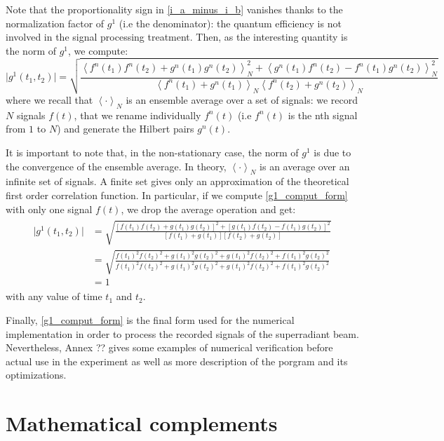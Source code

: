 \documentclass[12pt]{report}
\begin{document}
Note that the proportionality sign in \eqref{i_a_minus_i_b} vanishes thanks to the normalization factor of $g^1$ (i.e the denominator): the quantum efficiency is not involved in the signal processing treatment. Then, as the interesting quantity is the norm of $g^1$, we compute:
\begin{equation}
\label{g1_comput_form}
\vert g^1(t_1, t_2) \vert = \sqrt{\frac{\left\langle f^n(t_1)f^n(t_2) + g^n(t_1)g^n(t_2) \right\rangle^2_N + \left\langle g^n(t_1)f^n(t_2) - f^n(t_1)g^n(t_2) \right\rangle^2_N}{\left\langle f^n(t_1) + g^n(t_1) \right\rangle_N \left\langle f^n(t_2) + g^n(t_2) \right\rangle_N}}
\end{equation}
where we recall that $\left\langle \cdot \right\rangle_N$ is an ensemble average over a set of signals: we record $N$ signals $f(t)$, that we rename individually $f^n(t)$ (i.e $f^n(t)$ is the nth signal from $1$ to $N$) and generate the Hilbert pairs $g^n(t)$.

It is important to note that, in the non-stationary case, the norm of $g^1$ is due to the convergence of the ensemble average. In theory, $\left\langle \cdot \right\rangle_N$ is an average over an infinite set of signals. A finite set gives only an approximation of the theoretical first order correlation function. In particular, if we compute \eqref{g1_comput_form} with only one signal $f(t)$, we drop the average operation and get:
\begin{align}
\begin{split}
\vert g^1(t_1, t_2) \vert &= \sqrt{\frac{\left[f(t_1)f(t_2) + g(t_1)g(t_2) \right]^2 + \left[g(t_1)f(t_2) - f(t_1)g(t_2) \right]^2}{\left[f(t_1) + g(t_1) \right] \left[ f(t_2) + g(t_2) \right]}}\\
&= \sqrt{\frac{f(t_1)^2f(t_2)^2 + g(t_1)^2g(t_2)^2 + g(t_1)^2f(t_2)^2 + f(t_1)^2g(t_2)^2}{f(t_1)^2f(t_2)^2 + g(t_1)^2g(t_2)^2 + g(t_1)^2f(t_2)^2 + f(t_1)^2g(t_2)^2}}\\
&= 1
\end{split}
\end{align}
with any value of time $t_1$ and $t_2$.

Finally, \eqref{g1_comput_form} is the final form used for the numerical implementation in order to process the recorded signals of the superradiant beam. Nevertheless, Annex ?? gives some examples of numerical verification before actual use in the experiment as well as more description of the porgram and its optimizations.


\appendix
\chapter{Mathematical complements}
\end{document}
